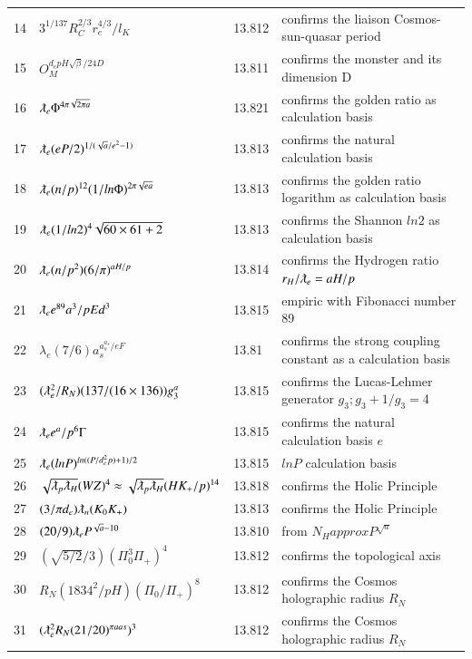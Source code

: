 \documentclass[a4paper,9pt]{article}
\begin{document}
\begin{appendix}
\begin{table}
\begin{tabular}{llll}
   14 & $3^{1/137} R_{C}^{2/3} r_e^{4/3} /l_K$ & 13.812 & confirms the liaison Cosmos-sun-quasar period\\
   15 & $O_M^{d_e pH\sqrt\beta / 24D}$ & 13.811 & confirms the monster and its dimension D\\
   16 & $\lambdabar_{e} \Phi ^{4\pi\sqrt{2\pi a}} $ & 13.821 & confirms the golden ratio as calculation basis\\
   17 & $\lambdabar_{e} (eP/2)^{1/(\sqrt a/e^2 - 1)} $ & 13.813 & confirms the natural calculation basis\\
   18 & $\lambdabar_{e} (n/p)^{12} (1/ln{\Phi}) ^{2\pi\sqrt{e a}} $ & 13.813 & confirms the golden ratio logarithm as calculation basis\\
   19 & $\lambdabar_{e} (1/ln2)^4\sqrt{60 \times 61+2} $ & 13.813 & confirms the Shannon $ln2$ as calculation basis\\
   20 & $\lambdabar_{e} (n/p^2) (6/\pi)^{aH/p}$ & 13.814 & confirms the Hydrogen ratio $r_H/\lambdabar_e = aH/p$\\    
   21 & $\lambdabar_{e} e^{89}  a^3/p{Ed}^3$ & 13.815 & empiric with Fibonacci number 89\\    
   22 & $ \lambda_{e} (7/6) a_s^{a_s^{a_s}/eF}  $   & 13.81 & confirms the strong coupling constant as a calculation basis \\       
   23 & $(\lambdabar_{e}^2/R_N) (137/(16 \times 136)) g_3^a$ & 13.815 & confirms the Lucas-Lehmer generator $g_3 ; g_3 +1/g_3 = 4$ \\
   24 & $\lambdabar_{e} e^a/p^6\Gamma $ & 13.815 & confirms the natural calculation basis $e$ \\    
   25 & $\lambdabar_{e} (lnP)^{ln((P/d_e^2 p)+1)/2} $ & 13.815 & $lnP$ calculation basis \\
   26 & $  \sqrt{\lambdabar_{p} \lambdabar_{H}} (WZ)^4 \approx \sqrt{\lambdabar_{p} \lambdabar_{H}}  (HK_+/p)^{14} $ & 13.818 & confirms the Holic Principle \\
   27 & $ (3/\pi d_e)\lambdabar_{n} (K_0 K_+)  $ & 13.813 & confirms the Holic Principle \\
   28 & $ (20/9)\lambdabar_{e} P^{\sqrt a - 10 }  $ & 13.810 & from $ N_H approx P^{\sqrt a} $  \\    
   29 & $ (\sqrt{5/2}/3) ( \Pi_0^3 \Pi_+)^4 $ & 13.812 & confirms the topological axis  \\
   30 & $ R_N (1834^2/pH) ( \Pi_0 /\Pi_+)^8 $ & 13.812 & confirms the Cosmos holographic radius $R_N $  \\
   31 & $ (\lambdabar_e ^2R_N (21/20)^{\pi aas})^3$ & 13.812 & confirms the Cosmos holographic radius $R_N $  \\ 

\end{tabular}
\end{table}
\end{appendix}
\end{document}
